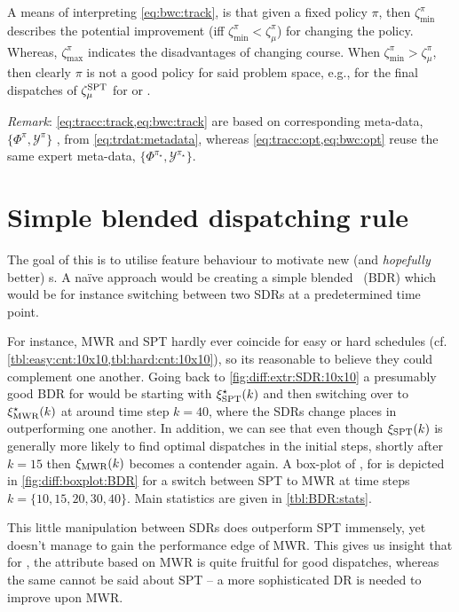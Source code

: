 \clearpage

A means of interpreting \cref{eq:bwc:track}, is that given a fixed policy 
$\pi$, then $\zeta_{\min}^{\pi}$ describes the potential improvement (iff 
$\zeta_{\min}^{\pi}<\zeta_{\mu}^{\pi}$) for changing the policy. Whereas, 
$\zeta_{\max}^{\pi}$ indicates the disadvantages of changing course. 
When $\zeta_{\min}^{\pi}>\zeta_{\mu}^{\pi}$, then clearly $\pi$ is not a good 
policy for said problem space, e.g., for the final dispatches of 
$\zeta_{\mu}^{\text{SPT}}$ for  or . 

\emph{Remark}: \cref{eq:tracc:track,eq:bwc:track} are based on corresponding 
meta-data, $\{\Phi^\pi,\mathcal{Y}^\pi\}$ , from \cref{eq:trdat:metadata}, 
whereas \cref{eq:tracc:opt,eq:bwc:opt} reuse the same expert meta-data,
$\{\Phi^{\pi_\star},\mathcal{Y}^{\pi_\star}\}$.

\section{Simple blended dispatching rule}\label{sec:diff:opt:bdr}
The goal of this  is to utilise feature behaviour 
to motivate new (and \emph{hopefully} better) \dr s. 
A na\"ive approach would be creating a simple blended \dr\ (BDR) which 
would be for instance switching between two SDRs at a predetermined time point. 

For instance, MWR and SPT hardly ever coincide for easy or hard schedules (cf. 
\cref{tbl:easy:cnt:10x10,tbl:hard:cnt:10x10}), so its reasonable to believe 
they could complement one another.
Going back to \cref{fig:diff:extr:SDR:10x10} a presumably good BDR for 
  would be starting with $\xi^\star_{\text{SPT}}(k)$ and then 
switching over to $\xi^\star_{\text{MWR}}(k)$ at around time step $k=40$, where 
the SDRs change places in outperforming one another.
In addition, we can see that even though $\xi_{\text{SPT}}(k)$ is generally 
more likely to find optimal dispatches in the initial steps, shortly after 
$k=15$ then $\xi_{\text{MWR}}(k)$ becomes a contender again. 
A box-plot of \namerho, for \Problem[10\times10]{\train} is 
depicted in \cref{fig:diff:boxplot:BDR} for a switch between SPT to MWR at time 
steps $k=\{10,15,20,30,40\}$. Main statistics are given in \cref{tbl:BDR:stats}.

This little manipulation between SDRs does outperform SPT immensely, yet 
doesn't manage to gain the performance edge of MWR. 
This gives us insight that for \jsp, the attribute based on MWR is quite 
fruitful for good dispatches, whereas the same cannot be said about SPT -- a 
more sophisticated DR is needed to improve upon MWR. 


